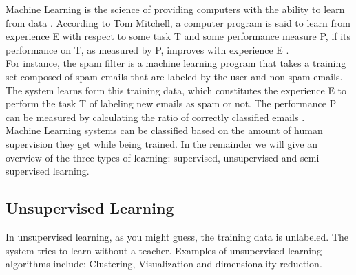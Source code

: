 Machine Learning is the science of providing computers with the ability to learn from data \cite{a:ML}.
According to Tom Mitchell, a computer program is said to learn from experience E with respect to some task T and some performance measure P, if its performance on T, as measured by P, improves with experience E \cite{a:Tom:MachineLearning}.\\
For instance, the spam filter is a machine learning program that takes a training set composed of spam emails that are labeled by the user and non-spam emails. The system learns form this training data, which constitutes the experience E to perform the task T of labeling new emails as spam or not. The performance P can be measured by calculating the ratio of correctly classified emails \cite{a:ML}.\\
Machine Learning systems can be classified based on the amount of human supervision they get while being trained. In the remainder we will give an overview of the three types of learning: supervised, unsupervised and semi-supervised learning.

\subsection{Unsupervised Learning}
In  unsupervised learning, as you might guess, the training data is unlabeled. The system tries to learn without a teacher. Examples of unsupervised learning algorithms include: Clustering, Visualization and dimensionality reduction.

